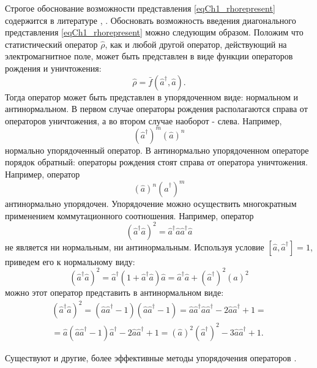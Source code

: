 Строгое обоснование возможности представления \eqref{eqCh1_rhorepresent}
содержится в литературе \cite{bQuantumOpticsAndRadioPhisicsLecture1966},
\cite{bKaluderSudershan1970}. 
Обосновать возможность введения диагонального представления
\eqref{eqCh1_rhorepresent} можно следующим образом. Положим что
статистический оператор $\hat{\rho}$, как и любой другой оператор,
действующий на электромагнитное поле, может быть представлен в виде
функции операторов рождения и уничтожения:
\[
\hat{\rho} = \bar{f}\left(\hat{a}^{\dag}, \hat{a}\right).
\]
Тогда оператор может быть представлен в упорядоченном виде: нормальном
и антинормальном. В первом случае операторы рождения располагаются
справа от операторов уничтожения, а во втором случае наоборот - слева.
Например, 
\[
\left(\hat{a}^{\dag}\right)^m\left(\hat{a}\right)^n
\]
нормально упорядоченный оператор. В антинормально упорядоченном
операторе порядок обратный: операторы рождения стоят справа от
оператора уничтожения. Например, оператор 
\[
\left(\hat{a}\right)^n\left(\hat{a}^{\dag}\right)^m
\]
антинормально упорядочен. Упорядочение можно осуществить многократным
применением коммутационного соотношения. Например, оператор  
\[
\left(\hat{a}^{\dag}\hat{a}\right)^2 =
\hat{a}^{\dag}\hat{a}\hat{a}^{\dag}\hat{a} 
\]
не является ни нормальным, ни антинормальным. Используя условие 
$\left[\hat{a},\hat{a}^{\dag}\right] = 1$,
приведем его к нормальному виду: 
\[
\left(\hat{a}^{\dag}\hat{a}\right)^2 = \hat{a}^{\dag}\left(1 +
\hat{a}^{\dag}\hat{a}\right)\hat{a} = 
\hat{a}^{\dag}\hat{a} + \left(\hat{a}^{\dag}\right)^2\left(\hat{a}\right)^2
\]
можно этот оператор представить в антинормальном виде:
\begin{eqnarray}
\left(\hat{a}^{\dag}\hat{a}\right)^2 = 
\left(\hat{a}\hat{a}^{\dag} - 1\right) \left(\hat{a}\hat{a}^{\dag} -
1\right) = \hat{a}\hat{a}^{\dag} \hat{a}\hat{a}^{\dag} - 2
\hat{a}\hat{a}^{\dag} + 1 =
\nonumber \\
= \hat{a}\left(\hat{a}\hat{a}^{\dag} - 1\right)\hat{a}^{\dag} -
2\hat{a}\hat{a}^{\dag} + 1 = 
\left(\hat{a}\right)^2\left(\hat{a}^{\dag}\right)^2 - 3
\hat{a}\hat{a}^{\dag} + 1.
\nonumber
\end{eqnarray}

Существуют и другие, более эффективные методы упорядочения операторов
\cite{bLuisell1972}.


